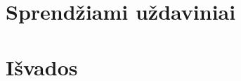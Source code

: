 \documentclass[12pt,a4paper]{article}
\begin{document}
\section{Sprendžiami uždaviniai}



\section{Išvados}



\newpage

\renewcommand\refname{Literatūros ir informacinių šaltinių sąrašas}



\end{document}
